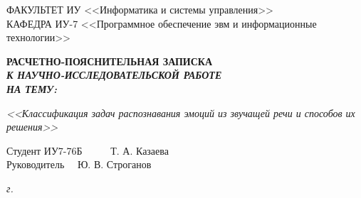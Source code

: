\begin{titlepage}
	{
		\small \raggedright
		ФАКУЛЬТЕТ ИУ <<Информатика и системы управления>> \\
		\vspace{3.3mm}
		КАФЕДРА ИУ-7 <<Программное обеспечение эвм и информационные технологии>> \\
	}

	\vspace{20.8mm}

	{
		\LARGE \bfseries
		РАСЧЕТНО-ПОЯСНИТЕЛЬНАЯ ЗАПИСКА \\
	}
	\vspace{5mm}
	{
		\Large \bfseries \itshape
		К НАУЧНО-ИССЛЕДОВАТЕЛЬСКОЙ РАБОТЕ \\
		\vspace{5mm}
		НА ТЕМУ: \\
	}

	{
		\Large \itshape
		<<Классификация задач распознавания эмоций из звучащей речи и способов их решения>>
	}

	\vfill

	Студент \hspace*{2.5cm} ИУ7-76Б \hfill \uline{} ~~~~~Т. А. Казаева~~~~\\
	
	Руководитель \hfill \uline{} 
	~~Ю. В. Строганов~~\\
	
	\vspace{14mm}
	
	\textit{{\the\year} г.}
	
\end{titlepage}